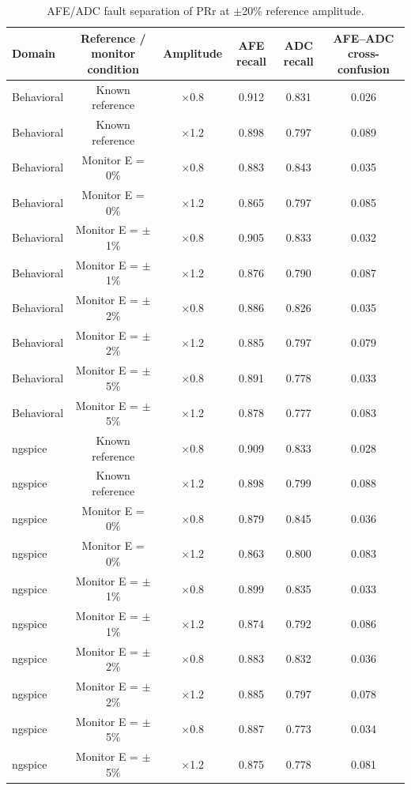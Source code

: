\begin{table}[H]
\caption{AFE/ADC fault separation of PRr at $\pm$20\% reference amplitude.\label{tab:table10_afe_adc_separation}}
\centering
\small
\begin{tabular}{lccccc}
\toprule
\textbf{Domain} & \textbf{Reference / monitor condition} & \textbf{Amplitude} & \textbf{AFE recall} & \textbf{ADC recall} & \textbf{AFE--ADC cross-confusion} \\
\midrule
Behavioral & Known reference & $\times$0.8 & 0.912 & 0.831 & 0.026 \\
Behavioral & Known reference & $\times$1.2 & 0.898 & 0.797 & 0.089 \\
Behavioral & Monitor E = 0\% & $\times$0.8 & 0.883 & 0.843 & 0.035 \\
Behavioral & Monitor E = 0\% & $\times$1.2 & 0.865 & 0.797 & 0.085 \\
Behavioral & Monitor E = $\pm$1\% & $\times$0.8 & 0.905 & 0.833 & 0.032 \\
Behavioral & Monitor E = $\pm$1\% & $\times$1.2 & 0.876 & 0.790 & 0.087 \\
Behavioral & Monitor E = $\pm$2\% & $\times$0.8 & 0.886 & 0.826 & 0.035 \\
Behavioral & Monitor E = $\pm$2\% & $\times$1.2 & 0.885 & 0.797 & 0.079 \\
Behavioral & Monitor E = $\pm$5\% & $\times$0.8 & 0.891 & 0.778 & 0.033 \\
Behavioral & Monitor E = $\pm$5\% & $\times$1.2 & 0.878 & 0.777 & 0.083 \\
ngspice & Known reference & $\times$0.8 & 0.909 & 0.833 & 0.028 \\
ngspice & Known reference & $\times$1.2 & 0.898 & 0.799 & 0.088 \\
ngspice & Monitor E = 0\% & $\times$0.8 & 0.879 & 0.845 & 0.036 \\
ngspice & Monitor E = 0\% & $\times$1.2 & 0.863 & 0.800 & 0.083 \\
ngspice & Monitor E = $\pm$1\% & $\times$0.8 & 0.899 & 0.835 & 0.033 \\
ngspice & Monitor E = $\pm$1\% & $\times$1.2 & 0.874 & 0.792 & 0.086 \\
ngspice & Monitor E = $\pm$2\% & $\times$0.8 & 0.883 & 0.832 & 0.036 \\
ngspice & Monitor E = $\pm$2\% & $\times$1.2 & 0.885 & 0.797 & 0.078 \\
ngspice & Monitor E = $\pm$5\% & $\times$0.8 & 0.887 & 0.773 & 0.034 \\
ngspice & Monitor E = $\pm$5\% & $\times$1.2 & 0.875 & 0.778 & 0.081 \\

\end{tabular}
\end{table}
